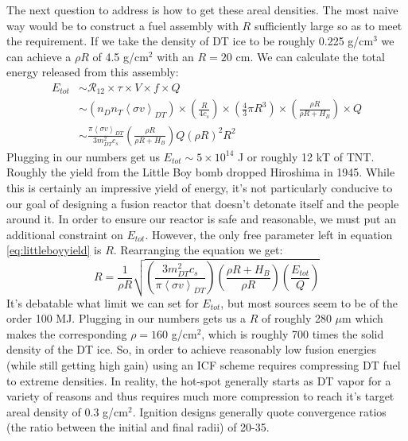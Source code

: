 The next question to address is how to get these areal densities. The most naive way would be to construct a fuel assembly with $R$ sufficiently large so as to meet the requirement. If we take the density of DT ice to be roughly 0.225 g/cm$^3$ we can achieve a $\rho R$ of 4.5 g/cm$^2$ with an $R=20$ cm. We can calculate the total energy released from this assembly:
%
\begin{equation}
	\begin{split}
		E_{tot} & \sim \mathcal{R}_{12} \times \tau \times V \times f \times Q \\
		& \sim \left(n_Dn_T\left<\sigma v\right>_{DT}\right) \times \left( \frac{R}{4 c_s}\right) \times \left(\frac{4}{3} \pi R^3\right) \times \left(\frac{\rho R}{\rho R + H_B}\right) \times Q \\
		& \sim \frac{\pi \left<\sigma v\right>_{DT}}{3 m_{DT}^2 c_s} \left(\frac{\rho R}{\rho R + H_B}\right)Q \left(\rho R\right)^2 R^2
	\end{split}
	\label{eq:littleboyyield}
\end{equation} 
%
Plugging in our numbers get us $E_{tot} \sim 5 \times 10^{14}$ J or roughly 12 kT of TNT. Roughly the yield from the Little Boy bomb dropped Hiroshima in 1945. While this is certainly an impressive yield of energy, it's not particularly conducive to our goal of designing a fusion reactor that doesn't detonate itself and the people around it. In order to ensure our reactor is safe and reasonable, we must put an additional constraint on $E_{tot}$. However, the only free parameter left in equation \ref{eq:littleboyyield} is $R$. Rearranging the equation we get:
%
\begin{equation}
	R = \frac{1}{\rho R} \sqrt{\left(\frac{3 m_{DT}^2 c_s}{\pi \left<\sigma v\right>_{DT}}\right) \left(\frac{\rho R + H_B}{\rho R}\right)\left(\frac{E_{tot}}{Q}\right) }
\end{equation}
%
It's debatable what limit we can set for $E_{tot}$, but most sources seem to be of the order 100 MJ. Plugging in our numbers gets us a $R$ of roughly 280 $\mu$m which makes the corresponding $\rho = 160$ g/cm$^2$, which is roughly 700 times the solid density of the DT ice.  So, in order to achieve reasonably low fusion energies (while still getting high gain) using an ICF scheme requires compressing DT fuel to extreme densities. In reality, the hot-spot generally starts as DT vapor for a variety of reasons and thus requires much more compression to reach it's target areal density of 0.3 g/cm$^2$. Ignition designs generally quote convergence ratios (the ratio between the initial and final radii) of 20-35. 


